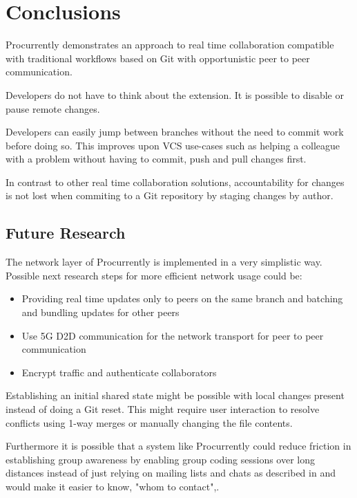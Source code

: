\chapter{Conclusions}

Procurrently demonstrates an approach to real time collaboration compatible with traditional workflows based on Git with opportunistic peer to peer communication. 

Developers do not have to think about the extension. It is possible to disable or pause remote changes. 

Developers can easily jump between branches without the need to commit work before doing so. This improves upon VCS use-cases such as helping a colleague with a problem without having to commit, push and pull changes first. 

In contrast to other real time collaboration solutions, accountability for changes is not lost when commiting to a Git repository by staging changes by author.

\section{Future Research}

The network layer of Procurrently is implemented in a very simplistic way.
Possible next research steps for more efficient network usage could be:

\begin{itemize}
    \item Providing real time updates only to peers on the same branch and batching and bundling updates for other peers
    \item Use 5G D2D communication for the network transport for peer to peer communication \cite{TehraniUysalYanikomeroglu:2014:Device-to-devicecommunicationin5G}
    \item Encrypt traffic and authenticate collaborators
\end{itemize}

Establishing an initial shared state might be possible with local changes present instead of doing a Git reset. This might require user interaction to resolve conflicts using 1-way merges or manually changing the file contents.\cite{7070484}

Furthermore it is possible that a system like Procurrently could reduce friction in establishing group awareness by enabling group coding sessions over long distances instead of just relying on mailing lists and chats as described in \cite{Gutwin:2004:GAD:1031607.1031621} and would make it easier to know, "whom to contact"\cite{795103},\cite{Gutwin:2004:GAD:1031607.1031621}.

